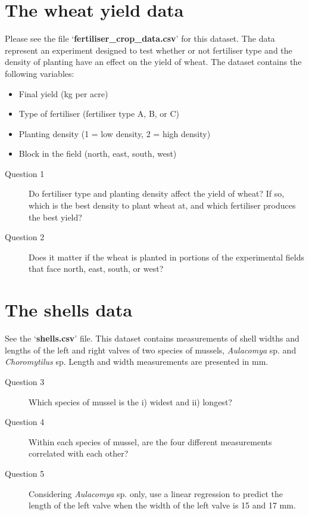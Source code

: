 \documentclass[10pt,a4,]{article}
\begin{document}
\section{The wheat yield data}

Please see the file `\textbf{fertiliser\_crop\_data.csv}' for this
dataset. The data represent an experiment designed to test whether or
not fertiliser type and the density of planting have an effect on the
yield of wheat. The dataset contains the following variables:

\begin{itemize}
\item Final yield (kg per acre)
\item Type of fertiliser (fertiliser type A, B, or C)
\item Planting density (1 = low density, 2 = high density)
\item Block in the field (north, east, south, west)
\end{itemize}

\begin{description}
\item[Question 1] Do fertiliser type and planting density affect the yield of wheat? If so, which is the best density to plant wheat at, and which fertiliser produces the best yield?
\item[Question 2] Does it matter if the wheat is planted in portions of the experimental fields that face north, east, south, or west?
\end{description}

\section{The shells data}

See the `\textbf{shells.csv}' file. This dataset contains measurements
of shell widths and lengths of the left and right valves of two species
of mussels, \emph{Aulacomya} sp. and \emph{Choromytilus} sp. Length and
width measurements are presented in mm.

\begin{description}
\item[Question 3] Which species of mussel is the i) widest and ii) longest?
\item[Question 4] Within each species of mussel, are the four different measurements correlated with each other?
\item[Question 5] Considering \emph{Aulacomya} sp. only, use a linear regression to predict the length of the left valve when the width of the left valve is 15 and 17 mm. 
\end{description}
\end{document}
